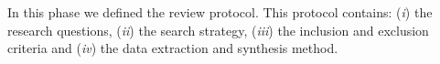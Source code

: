 In this phase we defined the review protocol. This protocol contains: (\textit{i}) the research questions, (\textit{ii}) the search strategy, (\textit{iii}) the inclusion and exclusion criteria and (\textit{iv}) the data extraction and synthesis method.







